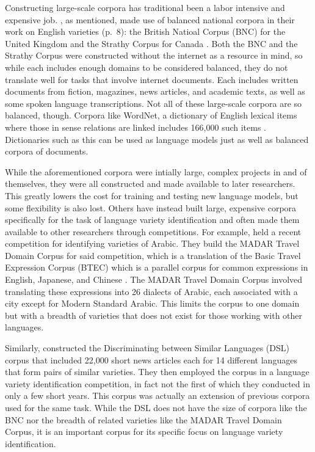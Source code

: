\documentclass{article}
\begin{document}
      Constructing large-scale corpora has traditional been a labor intensive and expensive job.
      \textcite{lui_classifying_2013}, as mentioned, made use of balanced national corpora in their work on English varieties (p.~8): the British Natioal Corpus (BNC) for the United Kingdom \parencite{bnc_consortium_british_2007} and the Strathy Corpus for Canada \parencite{noauthor_strathy_nodate}.
      Both the BNC and the Strathy Corpus were constructed without the internet as a resource in mind, so while each includes enough domains to be considered balanced, they do not translate well for tasks that involve internet documents.
      Each includes written documents from fiction, magazines, news articles, and academic texts, as well as some spoken language transcriptions.
      Not all of these large-scale corpora are so balanced, though.
      Corpora like WordNet, a dictionary of English lexical items where those in sense relations are linked includes 166,000 such items \parencite{miller_wordnet_1995}.
      Dictionaries such as this can be used as language models just as well as balanced corpora of documents.

      While the aforementioned corpora were intially large, complex projects in and of themselves, they were all constructed and made available to later researchers.
      This greatly lowers the cost for training and testing new language models, but some flexibility is also lost.
      Others have instead built large, expensive corpora specifically for the task of language variety identification and often made them available to other researchers through competitions.
      For example, \textcite{bouamor_madar_2019} held a recent competition for identifying varieties of Arabic.
      They build the MADAR Travel Domain Corpus for said competition, which is a translation of the Basic Travel Expression Corpus (BTEC) which is a parallel corpus for common expressions in English, Japanese, and Chinese \parencite{takezawa_multilingual_2007}.
      The MADAR Travel Domain Corpus involved translating these expressions into 26 dialects of Arabic, each associated with a city except for Modern Standard Arabic.
      This limits the corpus to one domain but with a breadth of varieties that does not exist for those working with other languages.

      Similarly, \textcite{zampieri_findings_2017} constructed the Discriminating between Similar Languages (DSL) corpus that included 22,000 short news articles each for 14 different languages that form pairs of similar varieties.
      They then employed the corpus in a language variety identification competition, in fact not the first of which they conducted in only a few short years.
      This corpus was actually an extension of previous corpora used for the same task.
      While the DSL does not have the size of corpora like the BNC nor the breadth of related varieties like the MADAR Travel Domain Corpus, it is an important corpus for its specific focus on language variety identification.
\end{document}
